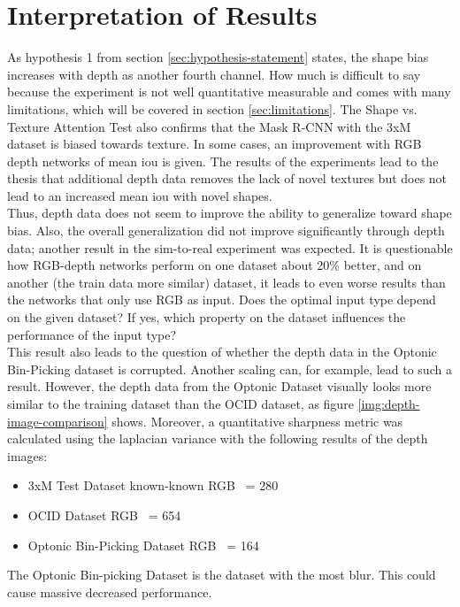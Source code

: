 	\section{Interpretation of Results}
	\label{sec:interpretation-of-results}
		As hypothesis 1 from section \ref{sec:hypothesis-statement} states, the shape bias increases with depth as another fourth channel. How much is difficult to say because the experiment is not well quantitative measurable and comes with many limitations, which will be covered in section \ref{sec:limitations}. The Shape vs. Texture Attention Test also confirms that the Mask R-CNN with the 3xM dataset is biased towards texture. In some cases, an improvement with RGB depth networks of mean \ac{iou} is given. The results of the experiments lead to the thesis that additional depth data removes the lack of novel textures but does not lead to an increased mean \ac{iou} with novel shapes.\\
		Thus, depth data does not seem to improve the ability to generalize toward shape bias. Also, the overall generalization did not improve significantly through depth data; another result in the sim-to-real experiment was expected. It is questionable how RGB-depth networks perform on one dataset about 20\% better, and on another (the train data more similar) dataset, it leads to even worse results than the networks that only use RGB as input.
		\clearpage
		Does the optimal input type depend on the given dataset? If yes, which property on the dataset influences the performance of the input type?\\
		This result also leads to the question of whether the depth data in the Optonic Bin-Picking dataset is corrupted. Another scaling can, for example, lead to such a result. However, the depth data from the Optonic Dataset visually looks more similar to the training dataset than the OCID dataset, as figure \ref{img:depth-image-comparison} shows. Moreover, a quantitative sharpness metric was calculated using the laplacian variance with the following results of the depth images:
		\begin{itemize}
			\item 3xM Test Dataset known-known RGB ~= 280
			\item OCID Dataset RGB ~= 654
			\item Optonic Bin-Picking Dataset RGB ~= 164
		\end{itemize}
		The Optonic Bin-picking Dataset is the dataset with the most blur. This could cause massive decreased performance.\\
